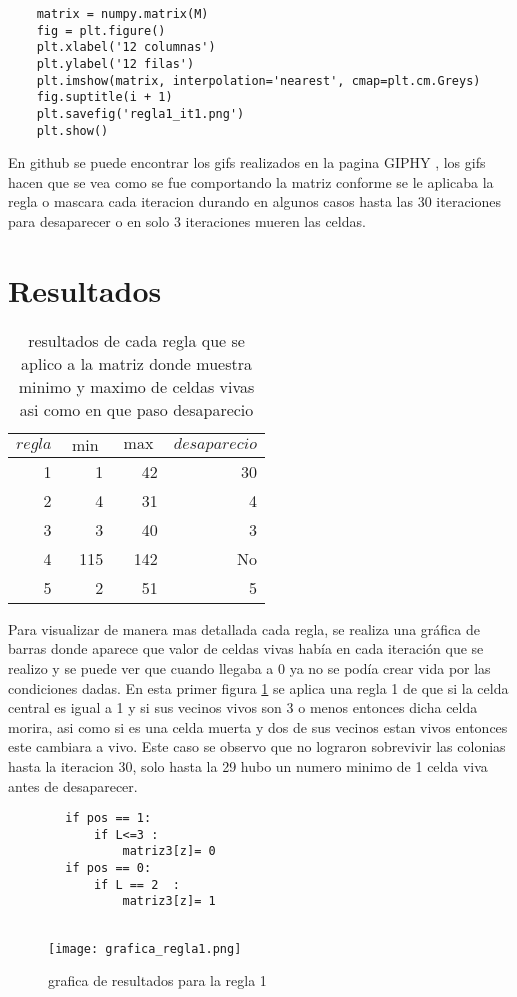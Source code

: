 \documentclass[a4paper, 11pt]{article}
\begin{document}
\begin{verbatim}
    matrix = numpy.matrix(M)   
    fig = plt.figure()
    plt.xlabel('12 columnas')
    plt.ylabel('12 filas')
    plt.imshow(matrix, interpolation='nearest', cmap=plt.cm.Greys)
    fig.suptitle(i + 1)
    plt.savefig('regla1_it1.png')
    plt.show()   
\end{verbatim}
En github \cite{Edson} se puede encontrar los gifs realizados en la pagina GIPHY \cite{GIPHY}, los gifs hacen que se vea como se fue comportando la matriz conforme se le aplicaba la regla o mascara cada iteracion durando en algunos casos hasta las 30 iteraciones para desaparecer o en solo 3 iteraciones mueren las celdas. 
\section{Resultados}

    \begin{table}[H]
        \caption{resultados de cada regla que se aplico a la matriz donde muestra minimo y maximo de celdas vivas asi como en que paso desaparecio}
        \bigskip
        \label{tab1}
        \centering
        \begin{tabular}{|r|rr|r|}
        \hline
        $regla$&$\min$&$\max$&$desaparecio$\\
        \hline
        1 & 1 & 42 & 30 \\
        2 & 4 & 31 & 4 \\
        3 & 3 & 40 & 3  \\
        4 & 115 & 142 & No \\
        5 & 2 & 51 & 5\\
        \hline
        \end{tabular}
    \end{table}
   
Para visualizar de manera mas detallada cada regla, se realiza una gráfica de barras donde aparece que valor de celdas vivas había en cada iteración que se realizo y se puede ver que cuando llegaba a 0 ya no se podía crear vida por las condiciones dadas.
En esta primer figura \ref{regla1} se aplica una regla 1 de que si la celda central es igual a 1 y si sus vecinos vivos son 3 o menos entonces dicha celda morira, asi como si es una celda muerta y dos de sus vecinos estan vivos entonces este cambiara a vivo. Este caso se observo que no lograron sobrevivir las colonias hasta la iteracion 30, solo hasta la 29 hubo un numero minimo de 1 celda viva antes de desaparecer.   
\begin{verbatim}
        if pos == 1:  
            if L<=3 : 
                matriz3[z]= 0 
        if pos == 0:  
            if L == 2  :  
                matriz3[z]= 1
                
\end{verbatim}
\begin{figure}[H]
  \centering      
  \caption{grafica de resultados para la regla 1}  
  \texttt{[image: grafica\_regla1.png]}
  \label{regla1}
\end{figure}
\end{document}
